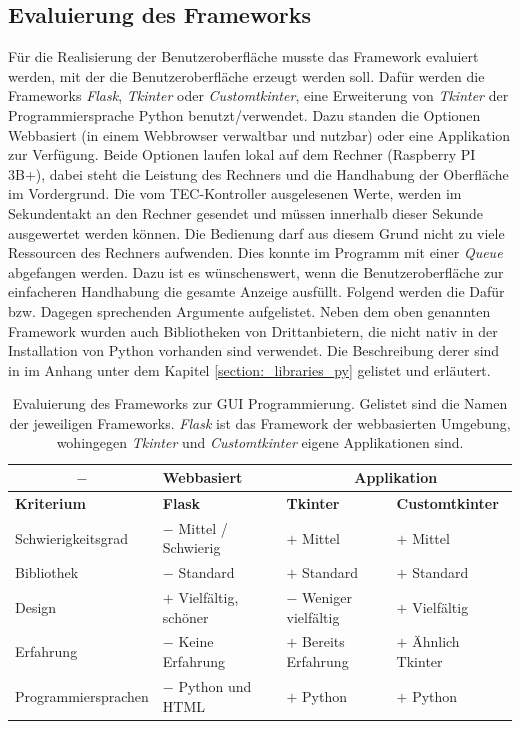 \subsection{Evaluierung des Frameworks}
Für die Realisierung der Benutzeroberfläche musste das Framework evaluiert werden, mit der die Benutzeroberfläche erzeugt werden soll. Dafür werden die Frameworks \textit{Flask}, \textit{Tkinter} oder \textit{Customtkinter}, eine Erweiterung von \textit{Tkinter} der Programmiersprache Python benutzt/verwendet. Dazu standen die Optionen Webbasiert (in einem Webbrowser verwaltbar und nutzbar) oder eine Applikation zur Verfügung. Beide Optionen laufen lokal auf dem Rechner (Raspberry PI 3B+), dabei steht die Leistung des Rechners und die Handhabung der Oberfläche im Vordergrund. Die vom TEC-Kontroller ausgelesenen Werte, werden im Sekundentakt an den Rechner gesendet und müssen innerhalb dieser Sekunde ausgewertet werden können. Die Bedienung darf aus diesem Grund nicht zu viele Ressourcen des Rechners aufwenden. Dies konnte im Programm mit einer \textit{Queue} abgefangen werden. Dazu ist es wünschenswert, wenn die Benutzeroberfläche zur einfacheren Handhabung die gesamte Anzeige ausfüllt. Folgend werden die Dafür bzw. Dagegen sprechenden Argumente aufgelistet.
Neben dem oben genannten Framework wurden auch Bibliotheken von Drittanbietern, die nicht nativ in der Installation von Python vorhanden sind verwendet. Die Beschreibung derer sind in im Anhang unter dem Kapitel \ref{section:_libraries_py} gelistet und erläutert.

\begin{table}[H]
    \centering
    \begin{tabular}{l|l|l|l}
        \multicolumn{1}{c|}{$-$}&   \textbf{Webbasiert}&        \multicolumn{2}{c}{\textbf{Applikation}}\\
        \hline
        \textbf{Kriterium}&         \textbf{Flask}&             \textbf{Tkinter}&           \textbf{Customtkinter}\\
        \hline
        Schwierigkeitsgrad&         $-$ Mittel / Schwierig&     $+$ Mittel&                 $+$ Mittel\\
        Bibliothek&                 $-$ Standard&               $+$ Standard&               $+$ Standard\\
        Design&                     $+$ Vielfältig, schöner&    $-$ Weniger vielfältig&     $+$ Vielfältig\\
        Erfahrung&                  $-$ Keine Erfahrung&        $+$ Bereits Erfahrung&      $+$ Ähnlich Tkinter\\
        Programmiersprachen&        $-$ Python und HTML&        $+$ Python&                 $+$ Python\\
    \end{tabular}
    \caption{Evaluierung des Frameworks zur GUI Programmierung. Gelistet sind die Namen der jeweiligen Frameworks. \textit{Flask} ist das Framework der webbasierten Umgebung, wohingegen \textit{Tkinter} und \textit{Customtkinter} eigene Applikationen sind.}
    \label{tab:gui_programming}
\end{table}

